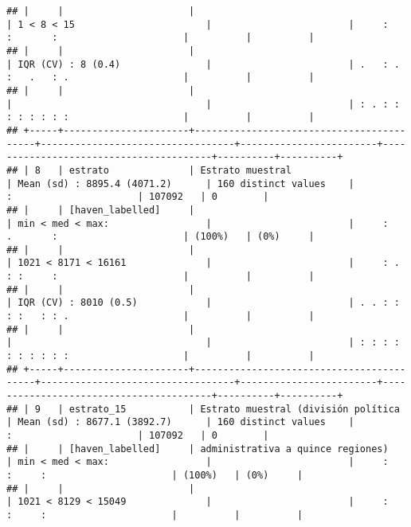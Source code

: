 \documentclass[]{article}
\begin{document}
\begin{verbatim}
## |     |                      |                                          | 1 < 8 < 15                       |                        |     :   :       :                      |          |          |
## |     |                      |                                          | IQR (CV) : 8 (0.4)               |                        | .   : . :   .   : .                    |          |          |
## |     |                      |                                          |                                  |                        | : . : : : : : : : :                    |          |          |
## +-----+----------------------+------------------------------------------+----------------------------------+------------------------+----------------------------------------+----------+----------+
## | 8   | estrato              | Estrato muestral                         | Mean (sd) : 8895.4 (4071.2)      | 160 distinct values    |                 :                      | 107092   | 0        |
## |     | [haven_labelled]     |                                          | min < med < max:                 |                        |     :   .       :                      | (100%)   | (0%)     |
## |     |                      |                                          | 1021 < 8171 < 16161              |                        |     : . : :     :                      |          |          |
## |     |                      |                                          | IQR (CV) : 8010 (0.5)            |                        | . . : : : :   : : .                    |          |          |
## |     |                      |                                          |                                  |                        | : : : : : : : : : :                    |          |          |
## +-----+----------------------+------------------------------------------+----------------------------------+------------------------+----------------------------------------+----------+----------+
## | 9   | estrato_15           | Estrato muestral (división política      | Mean (sd) : 8677.1 (3892.7)      | 160 distinct values    |                 :                      | 107092   | 0        |
## |     | [haven_labelled]     | administrativa a quince regiones)        | min < med < max:                 |                        |     :     :     :                      | (100%)   | (0%)     |
## |     |                      |                                          | 1021 < 8129 < 15049              |                        |     :     :     :                      |          |          |

\end{verbatim}
\end{document}
